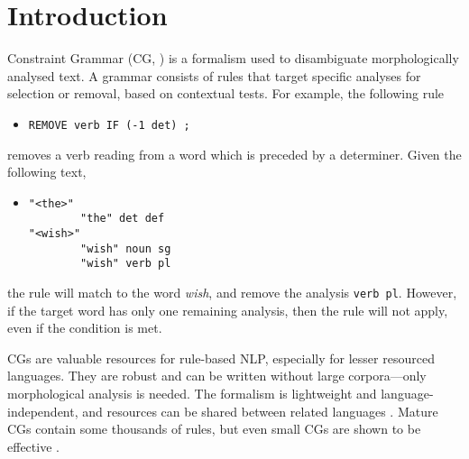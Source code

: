\section{Introduction}
\label{sec:intro}



Constraint Grammar (CG, \cite{karlsson1995constraint})
is a formalism used to disambiguate morphologically analysed text. 
A grammar consists of rules that target specific analyses for selection or removal, based on contextual tests. For example, the following rule
\begin{itemize}
\item[] \texttt{REMOVE verb IF (-1 det) ;}
\end{itemize}
removes a verb reading from a word which is preceded by a determiner.
Given the following text,
\begin{itemize}
\item[] 
\begin{verbatim}
"<the>"
        "the" det def
"<wish>"
        "wish" noun sg
        "wish" verb pl
\end{verbatim}
\end{itemize}
the rule will match to the word \emph{wish}, and remove the analysis \texttt{verb pl}.
However, if the target word has only one remaining analysis, then the rule will not apply, even if the condition is met.

CGs are valuable resources for rule-based NLP, especially for lesser
resourced languages. They are robust and can be written without large
corpora---only morphological analysis is needed. The formalism is
lightweight and language-independent, and resources can be shared
between related languages \cite{bick2006spanish,lene_trond_linda2010}.
Mature CGs contain some thousands of rules, but even small CGs are shown to be effective \cite{lene_trond2011}.

